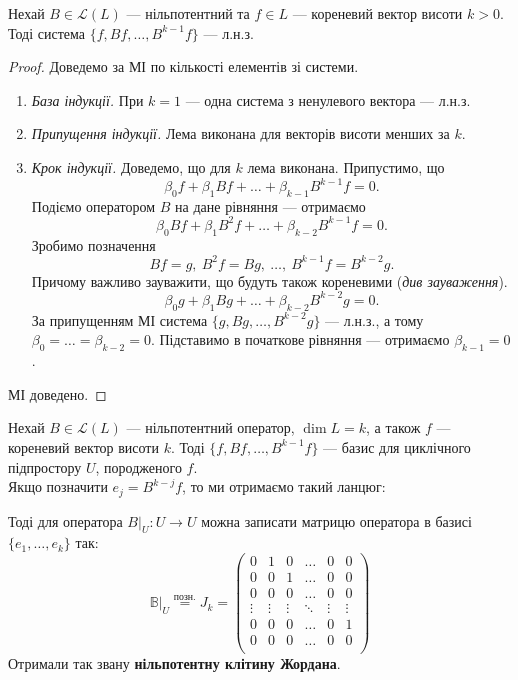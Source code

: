 \documentclass{math_library}
\begin{document}
\begin{lemma}
Нехай $B \in \mathcal{L}(L)$ --- нільпотентний та $f \in L$ --- кореневий вектор висоти $k>0$. Тоді система $\{f,Bf,\dots,B^{k-1}f\}$ --- л.н.з.
\end{lemma}

\begin{proof}
Доведемо за МІ по кількості елементів зі системи.
\begin{enumerate}[nosep,wide=0pt,label={\Roman*.}]
\item \textit{База індукції.} При $k = 1$ --- одна система з ненулевого вектора --- л.н.з.
\item \textit{Припущення індукції.} Лема виконана для векторів висоти менших за $k$. 
\item \textit{Крок індукції.} Доведемо, що для $k$ лема виконана. Припустимо, що
\[
\beta_0 f + \beta_1 Bf + \dots + \beta_{k-1}B^{k-1}f = 0.
\]
Подіємо оператором $B$ на дане рівняння --- отримаємо
\[
\beta_0 Bf + \beta_1 B^2f + \dots + \beta_{k-2}B^{k-1}f = 0.
\]
Зробимо позначення 
\[
Bf = g,\ B^2f = Bg,\ \dots,\ B^{k-1}f = B^{k-2}g.
\]
Причому важливо зауважити, що будуть також кореневими (\textit{див зауваження}).
\[
\beta_0 g + \beta_1 Bg + \dots + \beta_{k-2} B^{k-2}g = 0.
\]
За припущенням МІ система $\{g,Bg,\dots,B^{k-2}g\}$ --- л.н.з., а тому $\beta_0 = \dots = \beta_{k-2} = 0$. Підставимо в початкове рівняння --- отримаємо $\beta_{k-1} = 0$.
\end{enumerate}
МІ доведено.
\end{proof}

\begin{corollary}
Нехай $B \in \mathcal{L}(L)$ --- нільпотентний оператор, $\dim L = k$, а також $f$ --- кореневий вектор висоти $k$. Тоді $\{f,Bf,\dots,B^{k-1}f\}$ --- базис для циклічного підпростору $U$, породженого $f$.
\bigskip \\
Якщо позначити $e_j = B^{k-j}f$, то ми отримаємо такий ланцюг:
\begin{center}
\end{center}
\end{corollary}
\noindent
Тоді для оператора $B|_{U} \colon U \to U$ можна записати матрицю оператора в базисі $\{e_1,\dots,e_k\}$ так:
\[
\mathbb{B}|_{U} \overset{\text{позн.}}{=} J_k = \begin{pmatrix}
0 & 1 & 0 & \dots & 0 & 0 \\
0 & 0 & 1 & \dots & 0 & 0 \\
0 & 0 & 0 & \dots & 0 & 0 \\
\vdots & \vdots & \vdots & \ddots & \vdots & \vdots \\
0 & 0 & 0 & \dots & 0 & 1 \\
0 & 0 & 0 & \dots & 0 & 0 \\
\end{pmatrix}
\]
Отримали так звану \textbf{нільпотентну клітину Жордана}.
\end{document}
